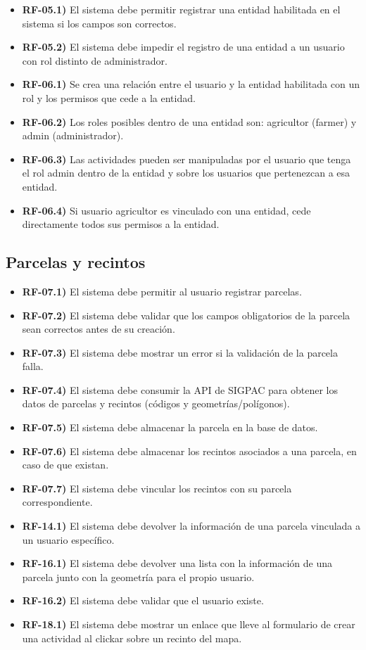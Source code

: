 \begin{itemize}
    \item \textbf{RF-05.1)} El sistema debe permitir registrar una entidad habilitada en el sistema si los campos son correctos.
    \item \textbf{RF-05.2)} El sistema debe impedir el registro de una entidad a un usuario con rol distinto de administrador.
    \item \textbf{RF-06.1)} Se crea una relación entre el usuario y la entidad habilitada con un rol y los permisos que cede a la entidad.
    \item \textbf{RF-06.2)} Los roles posibles dentro de una entidad son: agricultor (farmer) y admin (administrador).
    \item \textbf{RF-06.3)} Las actividades pueden ser manipuladas por el usuario que tenga el rol admin dentro de la entidad y sobre los
    usuarios que pertenezcan a esa entidad.
    \item \textbf{RF-06.4)} Si usuario agricultor es vinculado con una entidad, cede directamente todos sus permisos a la entidad. 
\end{itemize}

\subsection{Parcelas y recintos}

\begin{itemize}
    \item \textbf{RF-07.1)} El sistema debe permitir al usuario registrar parcelas.
    \item \textbf{RF-07.2)} El sistema debe validar que los campos obligatorios de la parcela sean correctos antes de su creación.
    \item \textbf{RF-07.3)} El sistema debe mostrar un error si la validación de la parcela falla.
    \item \textbf{RF-07.4)} El sistema debe consumir la API de SIGPAC para obtener los datos de parcelas y recintos (códigos y geometrías/polígonos).
    \item \textbf{RF-07.5)} El sistema debe almacenar la parcela en la base de datos.
    \item \textbf{RF-07.6)} El sistema debe almacenar los recintos asociados a una parcela, en caso de que existan.
    \item \textbf{RF-07.7)} El sistema debe vincular los recintos con su parcela correspondiente.
    \item \textbf{RF-14.1)} El sistema debe devolver la información de una parcela vinculada a un usuario específico.
    \item \textbf{RF-16.1)} El sistema debe devolver una lista con la información de una parcela junto con la geometría para el propio usuario.
    \item \textbf{RF-16.2)} El sistema debe validar que el usuario existe.
    \item \textbf{RF-18.1)} El sistema debe mostrar un enlace que lleve al formulario de crear una actividad al clickar sobre un recinto del mapa.
\end{itemize}

